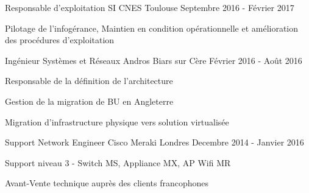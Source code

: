 \begin{cventries}
  \cventry
    {Responsable d'exploitation SI} %
    {CNES} %
    {Toulouse} %
    {Septembre 2016 - Février 2017} %
    {
      \begin{cvitems} %
        \item {Pilotage de l'infogérance, Maintien en condition opérationnelle et amélioration des procédures d'exploitation}
      \end{cvitems}
    }
    
  \cventry
  {Ingénieur Systèmes et Réseaux} %
  {Andros} %
  {Biars sur Cère} %
  {Février 2016 - Août 2016} %
  {
    \begin{cvitems} %
      \item {Responsable de la définition de l'architecture}
      \item {Gestion de la migration de BU en Angleterre}
      \item {Migration d'infrastructure physique vers solution virtualisée}
    \end{cvitems}
}

  \cventry
    {Support Network Engineer} %
    {Cisco Meraki} %
    {Londres} %
    {Decembre 2014 - Janvier 2016} %
    {
      \begin{cvdoubleitems} %
        \item {Support niveau 3 - Switch MS, Appliance MX, AP Wifi MR}
        \item {Avant-Vente technique auprès des clients francophones}
      \end{cvdoubleitems}
    }

\end{cventries}
